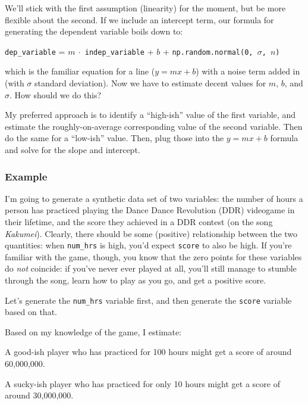 We'll stick with the first assumption (linearity) for the moment, but be more
flexible about the second. If we include an intercept term, our formula for
generating the dependent variable boils down to:

\begin{center}
\texttt{dep\_variable} = $m \ \cdot$ \texttt{indep\_variable}
+ $b$ + \texttt{np.random.normal(0, $\sigma$, $n$)}
\end{center}

which is the familiar equation for a line ($y=mx+b$) with a noise term added
in (with $\sigma$ standard deviation). Now we have to estimate decent values
for $m$, $b$, and $\sigma$. How should we do this?

\medskip

My preferred approach is to identify a ``high-ish'' value of the first
variable, and estimate the roughly-on-average corresponding value of the
second variable. Then do the same for a ``low-ish'' value. Then, plug those
into the $y=mx+b$ formula and solve for the slope and intercept.

\subsubsection{Example}

I'm going to generate a synthetic data set of two variables: the number of
hours a person has practiced playing the Dance Dance Revolution (DDR)
videogame in their lifetime, and the score they achieved in a DDR contest (on
the song \textit{Kakumei}). Clearly, there should be some (positive)
relationship between the two quantities: when \texttt{num\_hrs} is high, you'd
expect \texttt{score} to also be high. If you're familiar with the game,
though, you know that the zero points for these variables do \textit{not}
coincide: if you've never ever played at all, you'll still manage to stumble
through the song, learn how to play as you go, and get a positive score.

Let's generate the \texttt{num\_hrs} variable first, and then generate the
\texttt{score} variable based on that.

Based on my knowledge of the game, I estimate:
\begin{compactitem}
\item A good-ish player who has practiced for 100 hours might get a score of
around 60,000,000.
\item A sucky-ish player who has practiced for only 10 hours might get a score
of around 30,000,000.
\end{compactitem}

